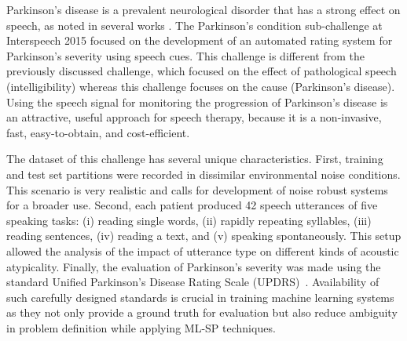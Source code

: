 \documentclass{article}
\begin{document}
Parkinson's disease is a prevalent neurological disorder that has a strong effect on speech, as noted in several works \cite{lieberman1992speech,kempler2002effect}. The Parkinson's condition sub-challenge at Interspeech 2015 focused on the development of an automated rating system for Parkinson's severity using speech cues. This challenge is different from the previously discussed challenge, which focused on the effect of pathological speech (intelligibility) whereas this challenge focuses on the cause (Parkinson's disease). Using the speech signal for monitoring the progression of Parkinson's disease is an attractive, useful approach for speech therapy, because it is a non-invasive, fast, easy-to-obtain, and cost-efficient.

The dataset of this challenge has several unique characteristics. First, training and test set partitions were recorded in dissimilar environmental noise conditions. This scenario is very realistic and calls for development of noise robust systems for a broader use. Second, each patient produced 42 speech utterances of five speaking tasks: (i) reading single words, (ii) rapidly repeating syllables, (iii) reading sentences, (iv) reading a text, and (v) speaking spontaneously. This setup allowed the analysis of the impact of utterance type on different kinds of acoustic atypicality. Finally, the evaluation of Parkinson's severity was made using the standard Unified Parkinson's Disease Rating Scale (UPDRS)~\cite{stebbins1998factor}. Availability of such carefully designed standards is crucial in training machine learning systems as they not only provide a ground truth for evaluation but also reduce ambiguity in problem definition while applying ML-SP techniques.
\end{document}
